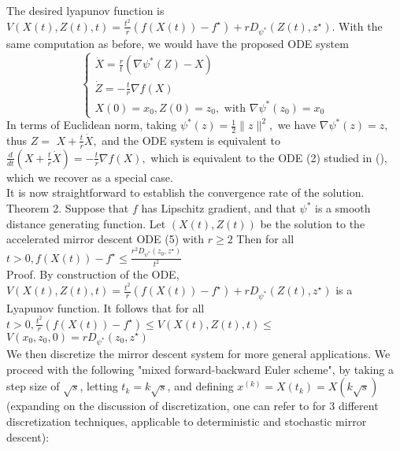 \documentclass{article}
\begin{document}
The desired lyapunov function is $V(X(t), Z(t), t)=\frac{t^{2}}{r}\left(f(X(t))-f^{\star}\right)+r D_{\psi^{*}}\left(Z(t), z^{\star}\right)$. With the same computation as before, we would have the proposed ODE system
$$
\left\{\begin{array}{l}
\dot{X}=\frac{r}{t}\left(\nabla \psi^{*}(Z)-X\right) \\
\dot{Z}=-\frac{t}{r} \nabla f(X) \\
X(0)=x_{0}, Z(0)=z_{0}, \text { with } \nabla \psi^{*}\left(z_{0}\right)=x_{0}
\end{array}\right.
$$
In terms of Euclidean norm, taking $\psi^{*}(z)=\frac{1}{2}\|z\|^{2},$ we have $\nabla \psi^{*}(z)=z,$ thus $Z=$ $X+\frac{t}{r} \dot{X},$ and the ODE system is equivalent to $\frac{d}{d t}\left(X+\frac{t}{r} \dot{X}\right)=-\frac{t}{r} \nabla f(X),$ which is equivalent to the ODE (2) studied in (\cite{su2014differential}), which we recover as a special case.\\

It is now straightforward to establish the convergence rate of the solution.\\
Theorem 2. Suppose that $f$ has Lipschitz gradient, and that $\psi^{*}$ is a smooth distance generating function. Let $(X(t), Z(t))$ be the solution to the accelerated mirror descent ODE (5) with $r \geq 2$ Then for all $t>0, f(X(t))-f^{\star} \leq \frac{r^{2} D_{\psi^{*}}\left(z_{0}, z^{\star}\right)}{t^{2}}$\\
Proof. By construction of the ODE, $V(X(t), Z(t), t)=\frac{t^{2}}{r}\left(f(X(t))-f^{\star}\right)+r D_{\psi^{*}}\left(Z(t), z^{\star}\right)$ is
a Lyapunov function. It follows that for all $t>0, \frac{t^{2}}{r}\left(f(X(t))-f^{\star}\right) \leq V(X(t), Z(t), t) \leq$ $V\left(x_{0}, z_{0}, 0\right)=r D_{\psi^{*}}\left(z_{0}, z^{\star}\right)$\\

We then discretize the mirror descent system for more general applications. We proceed with the following "mixed forward-backward Euler scheme", by taking a step size of $\sqrt{s}$, letting $t_{k}=k \sqrt{s}$, and defining $x^{(k)} = X\left(t_{k}\right)=X(k \sqrt{s})$ (expanding on the discussion of discretization, one can refer to \cite{xu2018accelerated} for 3 different discretization techniques, applicable to deterministic and stochastic mirror descent):\\
\end{document}
